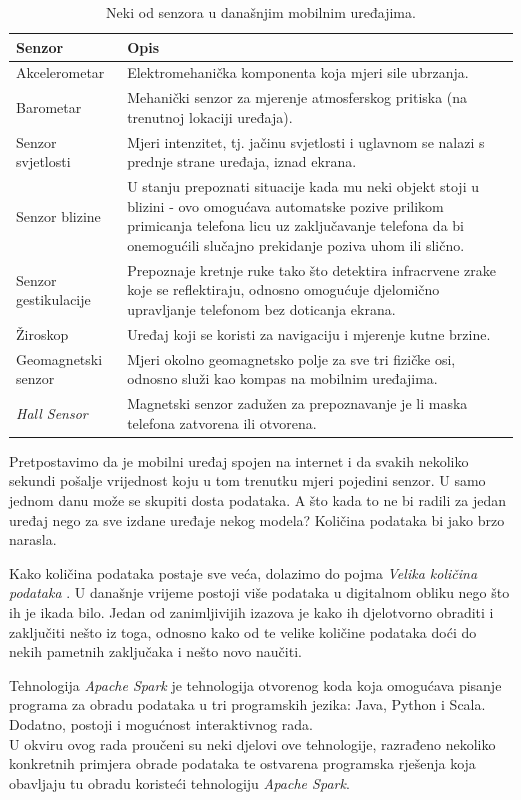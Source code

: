 \documentclass[times, utf8, zavrsni, numeric]{fer}
\begin{document}
\begin{table}[htb]
\caption{Neki od senzora u današnjim mobilnim uređajima.}
\label{tbl:senzori}
\centering
\begin{tabular}{l p{8cm}}
\hline
Senzor & Opis \\
\hline
Akcelerometar & Elektromehanička komponenta koja mjeri sile ubrzanja. \\
Barometar & Mehanički senzor za mjerenje atmosferskog pritiska (na trenutnoj lokaciji uređaja).\\
Senzor svjetlosti & Mjeri intenzitet, tj. jačinu svjetlosti i uglavnom se nalazi s prednje strane uređaja, iznad ekrana. \\
Senzor blizine & U stanju prepoznati situacije kada mu neki objekt stoji u blizini - ovo omogućava automatske pozive prilikom primicanja telefona licu uz zaključavanje telefona da bi onemogućili slučajno prekidanje poziva uhom ili slično.\\
Senzor gestikulacije & Prepoznaje kretnje ruke tako što detektira infracrvene zrake koje se reflektiraju, odnosno omogućuje djelomično upravljanje telefonom bez doticanja ekrana.\\
Žiroskop & Uređaj koji se koristi za navigaciju i mjerenje kutne brzine.\\
Geomagnetski senzor & Mjeri okolno geomagnetsko polje za sve tri fizičke osi, odnosno služi kao kompas na mobilnim uređajima. \\
\emph{Hall Sensor} & Magnetski senzor zadužen za prepoznavanje je li  maska telefona zatvorena ili otvorena. \\
\hline
\end{tabular}
\end{table}

Pretpostavimo da je mobilni uređaj spojen na internet i da svakih nekoliko sekundi pošalje vrijednost koju u tom trenutku mjeri pojedini senzor. U samo jednom danu može se skupiti dosta podataka. A što kada to ne bi radili za jedan uređaj nego za sve izdane uređaje nekog modela? Količina podataka bi jako brzo narasla.

Kako količina podataka postaje sve veća, dolazimo do pojma \emph{Velika količina podataka} . U današnje vrijeme postoji više podataka u digitalnom obliku nego što ih je ikada bilo. Jedan od zanimljivijih izazova je kako ih djelotvorno obraditi i zaključiti nešto iz toga, odnosno kako od te velike količine podataka doći do nekih pametnih zaključaka i nešto novo naučiti.

Tehnologija \emph{Apache Spark} je tehnologija otvorenog koda  koja omogućava pisanje programa za obradu podataka u tri programskih jezika: Java, Python i Scala. Dodatno, postoji i mogućnost interaktivnog rada. \\
U okviru ovog rada proučeni su neki djelovi ove tehnologije, razrađeno nekoliko konkretnih primjera obrade podataka te ostvarena programska rješenja koja obavljaju tu obradu koristeći tehnologiju \emph{Apache Spark}.
\end{document}
